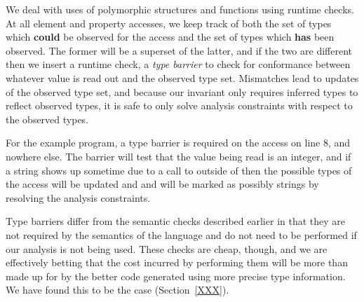 We deal with uses of polymorphic structures and functions using runtime checks.
At all element and property accesses, we keep track of both the set of
types which {\bf could} be observed for the access and the set of types
which {\bf has} been observed.
The former will be a superset of the latter, and if the two are different then
we insert a runtime check, a {\it type barrier} to check for conformance
between whatever value is read out and the observed type set.
Mismatches lead to updates of the observed type set, and because our
invariant only requires inferred types to reflect observed types, it is
safe to only solve analysis constraints with respect to the observed types.

For the example program, a type barrier is required on the  access
on line 8, and nowhere else. The barrier will test that the value being read
is an integer, and if a string shows up sometime due to a call to 
outside of  then the possible types of the  access
will be updated and  and  will be marked as possibly
strings by resolving the analysis constraints.

Type barriers differ from the semantic checks described earlier in that
they are not required by the semantics of the language and do not need to
be performed if our analysis is not being used.
These checks are cheap, though, and we are effectively betting that the
cost incurred by performing them will be more than made up for by
the better code generated using more precise type information.
We have found this to be the case (Section~\ref{XXX}).


